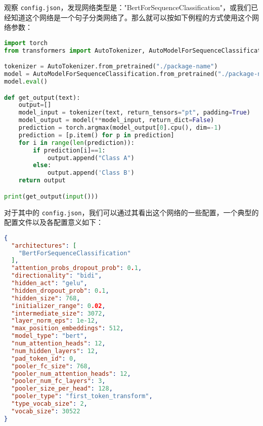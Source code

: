 观察 \verb`config.json`，发现网络类型是："BertForSequenceClassification"，或我们已经知道这个网络是一个句子分类网络了。那么就可以按如下例程的方式使用这个网络参数：
\begin{lstlisting}[language=python]
import torch
from transformers import AutoTokenizer, AutoModelForSequenceClassification # 后面的 ForSequenceClassification 是根据网络类型得到的，可以在编辑器中输入 AutoModel 

tokenizer = AutoTokenizer.from_pretrained("./package-name")
model = AutoModelForSequenceClassification.from_pretrained("./package-name")
model.eval()

def get_output(text):
    output=[]
    model_input = tokenizer(text, return_tensors="pt", padding=True)
    model_output = model(**model_input, return_dict=False)
    prediction = torch.argmax(model_output[0].cpu(), dim=-1)
    prediction = [p.item() for p in prediction]
    for i in range(len(prediction)):
        if prediction[i]==1:
            output.append("Class A")
        else:
            output.append('Class B')
    return output

print(get_output(input()))
\end{lstlisting}

对于其中的 \verb`config.json`，我们可以通过其看出这个网络的一些配置，一个典型的配置文件以及各配置意义如下：
\begin{lstlisting}[language=json]
{
  "architectures": [
    "BertForSequenceClassification"
  ],
  "attention_probs_dropout_prob": 0.1,
  "directionality": "bidi",
  "hidden_act": "gelu",
  "hidden_dropout_prob": 0.1,
  "hidden_size": 768,
  "initializer_range": 0.02,
  "intermediate_size": 3072,
  "layer_norm_eps": 1e-12,
  "max_position_embeddings": 512,
  "model_type": "bert",
  "num_attention_heads": 12,
  "num_hidden_layers": 12,
  "pad_token_id": 0,
  "pooler_fc_size": 768,
  "pooler_num_attention_heads": 12,
  "pooler_num_fc_layers": 3,
  "pooler_size_per_head": 128,
  "pooler_type": "first_token_transform",
  "type_vocab_size": 2,
  "vocab_size": 30522
}
\end{lstlisting}

